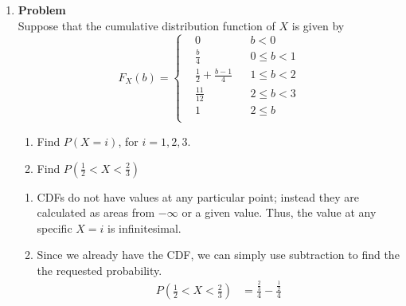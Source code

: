 \documentclass[12pt]{article}
\newenvironment{Ex}{\textbf{Problem}\vspace{.75em}\\}{}
\newcommand{\dd}[1]{\:\mathrm{d}{#1}}
\begin{document}
\begin{enumerate}
\begin{Ex}
\begin{solution}
\begin{enumerate}
\begin{equation}
\begin{aligned}
            \int_{-2}^{1}\frac{1}{2\sqrt{2\pi}}e^{-\frac{(y-1)^2}{8}}\dd{y} \\
            \implies P(-2 \le Y \le 1) &= 0.4332 \\
          \end{aligned}
        \end{equation}
      \item $P(|Y|^2 < 1.5)$ is \hfill {\huge TODO}.
      \end{enumerate}
    \end{solution}
  \end{Ex}
\item
  \begin{Ex}
    Suppose that the cumulative distribution function of $X$ is given
    by
    \begin{equation}
      \label{eq:2-question}
      F_X(b) = \left\{
        \begin{aligned}
          & 0 && b<0 \\
          & \frac{b}{4} && 0 \le b < 1 \\
          & \frac{1}{2} + \frac{b-1}{4}  && 1 \le b < 2 \\
          & \frac{11}{12} && 2 \le b < 3 \\
          & 1 && 2 \le b \\
        \end{aligned} \right.
    \end{equation}
    \begin{enumerate}
    \item Find $P(X=i)$, for $i=1,2,3$.
    \item Find $P\left(\frac{1}{2} < X < \frac{2}{3}\right)$
    \end{enumerate}
    \begin{solution} \hfill
      \begin{enumerate}
      \item CDFs do not have values at any particular point; instead
        they are calculated as areas from $-\infty$ or a given
        value. Thus, the value at any specific $X=i$ is infinitesimal.
      \item Since we already have the CDF, we can simply use
        subtraction to find the the requested probability.
        \begin{equation}
          \label{eq:3b-sol}
          \begin{aligned}
            P\left(\frac{1}{2} < X < \frac{2}{3}\right) &=
            \frac{\frac{2}{3}}{4} - \frac{\frac{1}{2}}{4} \\

\end{aligned}
\end{equation}
\end{enumerate}
\end{solution}
\end{Ex}
\end{enumerate}
\end{document}
